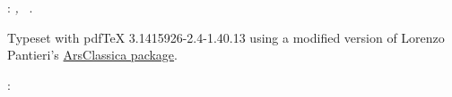 \thispagestyle{empty}

\hfill
\vfill

\noindent\myName:
\textit{\myTitle,} %
\textcopyright\ \myTime. 

\noindent Typeset with pdfTeX 3.1415926-2.4-1.40.13 using a modified version of Lorenzo Pantieri's \href{http://www.ctan.org/tex-archive/macros/latex/contrib/arsclassica/}{ArsClassica package}.

\medskip
{}: \\

\bigskip
